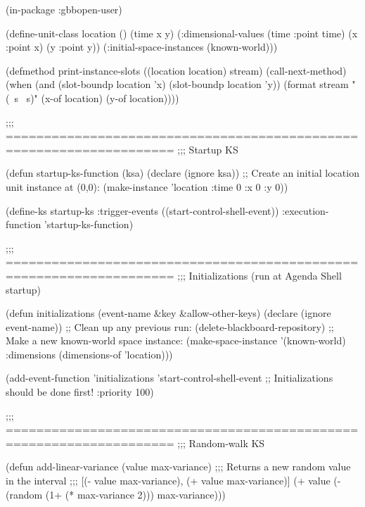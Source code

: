 \documentclass[10pt,twoside,english,pdftex]{article}
\begin{document}
\begin{example}
 (in-package :gbbopen-user)

  (define-unit-class location ()
    (time 
     x y)
    (:dimensional-values
      (time :point time)
      (x :point x)
      (y :point y))
    (:initial-space-instances (known-world)))

  (defmethod print-instance-slots ((location location) stream)
    (call-next-method)
    (when (and (slot-boundp location 'x)
               (slot-boundp location 'y))
      (format stream " (~s ~s)"
              (x-of location)
              (y-of location))))

  ;;; ====================================================================
  ;;;   Startup KS

  (defun startup-ks-function (ksa)
    (declare (ignore ksa))
    ;; Create an initial location unit instance at (0,0):
    (make-instance 'location :time 0 :x 0 :y 0))

  (define-ks startup-ks
      :trigger-events ((start-control-shell-event))
      :execution-function 'startup-ks-function)

  ;;; ====================================================================
  ;;;   Initializations (run at Agenda Shell startup)

  (defun initializations (event-name &key &allow-other-keys)
    (declare (ignore event-name))
    ;; Clean up any previous run:
    (delete-blackboard-repository)
    ;; Make a new known-world space instance:
    (make-space-instance 
     '(known-world)
     :dimensions (dimensions-of 'location)))

  (add-event-function 'initializations 'start-control-shell-event
                      ;; Initializations should be done first!
                      :priority 100)

  ;;; ====================================================================
  ;;;   Random-walk KS

  (defun add-linear-variance (value max-variance)
    ;;; Returns a new random value in the interval
    ;;; [(- value max-variance), (+ value max-variance)]
    (+ value (- (random (1+ (* max-variance 2))) max-variance)))


\end{example}
\end{document}
